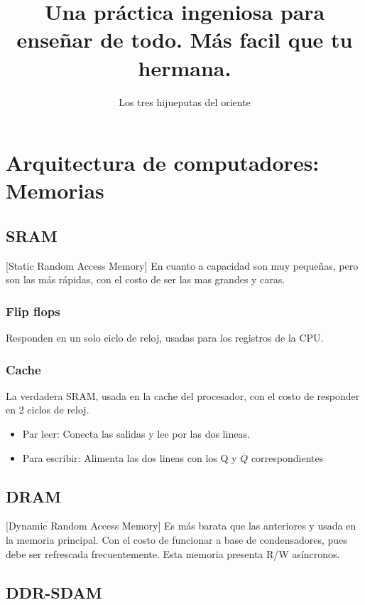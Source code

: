 \documentclass{article}
\title{Una práctica ingeniosa para enseñar de todo. Más facil que tu hermana.}
\author{Los tres hijueputas del oriente}
\begin{document}
	
	
	{\centering \section*{Arquitectura de computadores: Memorias}}
	
	\setcounter{section}{0}
	
	\begin{multicols}{2}
		\subsection{SRAM}
		
		[Static Random Access Memory] En cuanto a capacidad son muy pequeñas, pero son las más rápidas, con el costo de ser las mas grandes y caras.
		
		\subsubsection{Flip flops}
		
		Responden en un solo ciclo de reloj, usadas para los registros de la CPU.
		
		\subsubsection{Cache}
		
		La verdadera SRAM, usada en la cache del procesador, con el costo de responder en 2 ciclos de reloj.
		
		\begin{itemize}
			\item Par leer: Conecta las salidas y lee por las dos lineas.
			\item Para escribir: Alimenta las dos lineas con los Q y $\overline{Q}$ correspondientes
		\end{itemize}
		
		\subsection{DRAM}
		
		[Dynamic Random Access Memory] Es más barata que las anteriores y usada en la memoria principal. Con el costo de funcionar a base de condensadores, pues debe ser refrescada frecuentemente. Esta memoria presenta R/W asíncronos.
		
		\subsection{DDR-SDAM}
		

\end{multicols}
\end{document}
